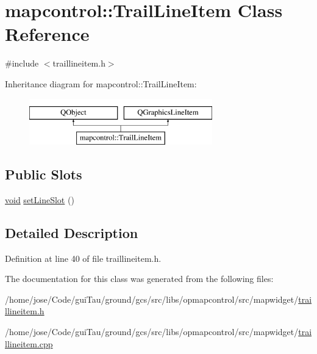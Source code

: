 \hypertarget{classmapcontrol_1_1_trail_line_item}{\section{mapcontrol\-:\-:Trail\-Line\-Item Class Reference}
\label{classmapcontrol_1_1_trail_line_item}
}


{\ttfamily \#include $<$traillineitem.\-h$>$}

Inheritance diagram for mapcontrol\-:\-:Trail\-Line\-Item\-:\begin{figure}[H]
\begin{center}
\leavevmode
\includegraphics[height=2.000000cm]{classmapcontrol_1_1_trail_line_item}
\end{center}
\end{figure}
\subsection*{Public Slots}
\begin{DoxyCompactItemize}
\item 
\hyperlink{group___u_a_v_objects_plugin_ga444cf2ff3f0ecbe028adce838d373f5c}{void} \hyperlink{group___o_p_map_widget_gaca380937db6013081d160fdcfed13e2f}{set\-Line\-Slot} ()
\end{DoxyCompactItemize}


\subsection{Detailed Description}


Definition at line 40 of file traillineitem.\-h.



The documentation for this class was generated from the following files\-:\begin{DoxyCompactItemize}
\item 
/home/jose/\-Code/gui\-Tau/ground/gcs/src/libs/opmapcontrol/src/mapwidget/\hyperlink{traillineitem_8h}{traillineitem.\-h}\item 
/home/jose/\-Code/gui\-Tau/ground/gcs/src/libs/opmapcontrol/src/mapwidget/\hyperlink{traillineitem_8cpp}{traillineitem.\-cpp}\end{DoxyCompactItemize}
